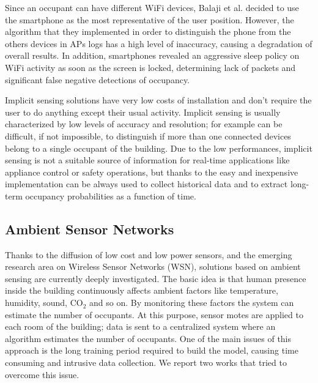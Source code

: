 Since an occupant can have different WiFi devices, Balaji et al. decided to use the smartphone as the most representative of the user position. However, the algorithm that they implemented in order to distinguish the phone from the others devices in APs logs has a high level of inaccuracy, causing a degradation of overall results. In addition, smartphones revealed an aggressive sleep policy on WiFi activity as soon as the screen is locked, determining lack of packets and significant false negative detections of occupancy.

\medskip
Implicit sensing solutions have very low costs of installation and don't require the user to do anything except their usual activity. Implicit sensing is usually characterized by low levels of accuracy and resolution; for example can be difficult, if not impossible, to distinguish if more than one connected devices belong to a single occupant of the building. Due to the low performances, implicit sensing is not a suitable source of information for real-time applications like appliance control or safety operations, but thanks to the easy and inexpensive implementation can be always used to collect historical data and to extract long-term occupancy probabilities as a function of time.

\subsection{Ambient Sensor Networks}
\label{subsec:ambient}
Thanks to the diffusion of low cost and low power sensors, and the emerging research area on Wireless Sensor Networks (WSN), solutions based on ambient sensing are currently deeply investigated.
The basic idea is that human presence inside the building continuously affects ambient factors like temperature, humidity, sound, CO\(_2\) and so on. By monitoring these factors the system can estimate the number of occupants.
At this purpose, sensor motes are applied to each room of the building; data is sent to a centralized system where an algorithm estimates the number of occupants. One of the main issues of this approach is the long training period required to build the model, causing time consuming and intrusive data collection. We report two works that tried to overcome this issue.

